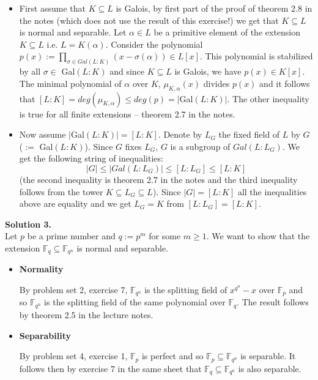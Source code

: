 \documentclass[12pt,a4paper]{article}
\begin{document}
\begin{itemize}
	\item First assume that $K\subseteq L$ is Galois, by first part of the proof of theorem 2.8 in the notes (which does not use the result of this exercise!) we get that $K\subseteq L$ is normal and separable. Let $\alpha\in L$ be a primitive element of the extension $K\subseteq L$ i.e. $L=K(\alpha)$. Consider the polynomial $p(x):=\prod_{\sigma\in Gal(L:K)}(x-\sigma(\alpha))\in L[x]$. This polynomial is stabilized by all  $\sigma\in $ Gal$(L : K)$ and since $K\subseteq L$ is Galois, we have $p(x)\in K[x]$. The minimal polynomial of $\alpha$ over $K$, $\mu_{K,\alpha}(x)$ divides $p(x)$ and it follows that $[L:K]=deg(\mu_{K,\alpha})\leq deg(p)= |$Gal$(L : K)|$. The other inequality is true for all finite extensions -- theorem 2.7 in the notes.
	
	\item Now assume $|$Gal$(L:K)|=[L:K]$. Denote by $L_{G}$ the fixed field of $L$ by $G$ ($:=$ Gal$(L:K)$). Since $G$ fixes $L_G$, $G$ is a subgroup of $Gal(L:L_G)$. We get the following string of inequalities: $$ |G|\leq |Gal(L:L_G)|\leq [L:L_G]\leq [L:K]$$ (the second inequality is theorem 2.7 in the notes and the third inequality follows from the tower $K\subseteq L_G\subseteq L$). Since $|G|=[L:K]$ all the inequalities above are equality and we get $L_G=K$ from $[L:L_G]=[L:K]$.
\end{itemize}{}

\noindent
\textbf{Solution 3.}\\
Let $p$ be a prime number and $q:=p^m$ for some $m\geq 1$. We want to show that the extension $\mathbb{F}_q\subseteq \mathbb{F}_{q^n}$ is normal and separable.
\begin{itemize}
	\item \textbf{Normality} 
	
	By problem set 2, exercise 7, $\mathbb{F}_{q^n}$ is the splitting field of $x^{q^n}-x$ over $\mathbb{F}_p$ and so $\mathbb{F}_{q^n}$ is the splitting field of the same polynomial over $\mathbb{F}_q$. The result follows by theorem 2.5 in the lecture notes.
	
	\item \textbf{Separability} 
	
	By problem set 4, exercise 1, $\mathbb{F}_p$ is perfect and so $\mathbb{F}_p\subseteq \mathbb{F}_{q^n}$ is separable. It follows then by exercise 7 in the same sheet that $\mathbb{F}_q\subseteq \mathbb{F}_{q^n}$ is also separable. 
\end{itemize}{}
\end{document}
